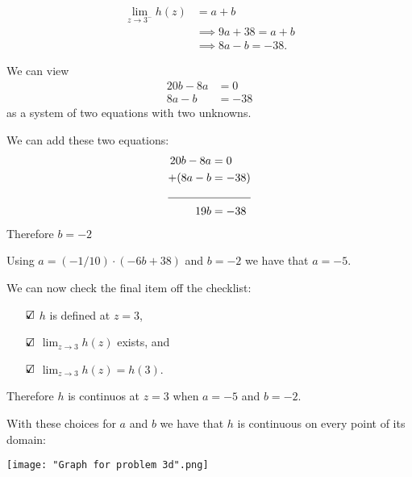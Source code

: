 \documentclass{article}
\theoremstyle{definition}
\begin{document}
\begin{Solution}
  \begin{align*}
    \lim_{z \to 3^-} h(z) &= a + b \\
    &\implies 9a + 38 = a + b \\
    &\implies 8a - b  = -38.
  \end{align*}

  We can view
  \begin{align*}
    20b - 8a &= 0 \\
    8a - b  &= -38
  \end{align*}
  as a system of two equations with two unknowns.

  We can add these two equations:
  \begin{align*}
     20b - 8a &= 0 \\
   + (8a - b  &= -38)\\
     \cline{1-2}
    19b &= -38
  \end{align*}
  Therefore $b = -2$

  Using $a = (-1/10) \cdot (-6b + 38)$ and $b = -2$ we have that $a = -5$.

  We can now check the final item off the checklist:
  \begin{itemize}
    \item[$\text{\rlap{$\checkmark$}}\square$]
      $h$ is defined at $z = 3$,

    \item[$\text{\rlap{$\checkmark$}}\square$]
      $\lim_{z \to 3} h(z)$ exists, and

    \item[$\text{\rlap{$\checkmark$}}\square$]  
      $\lim_{z \to 3} h(z) = h(3)$.
  \end{itemize}
  
  Therefore $h$ is continuos at $z = 3$ when $a = -5$ and $b = -2$.

  With these choices for $a$ and $b$ we have that $h$ is continuous on every point of its domain:
  \begin{center}
    \texttt{[image: "Graph for problem 3d".png]}
  \end{center}
\end{Solution}
\end{document}
